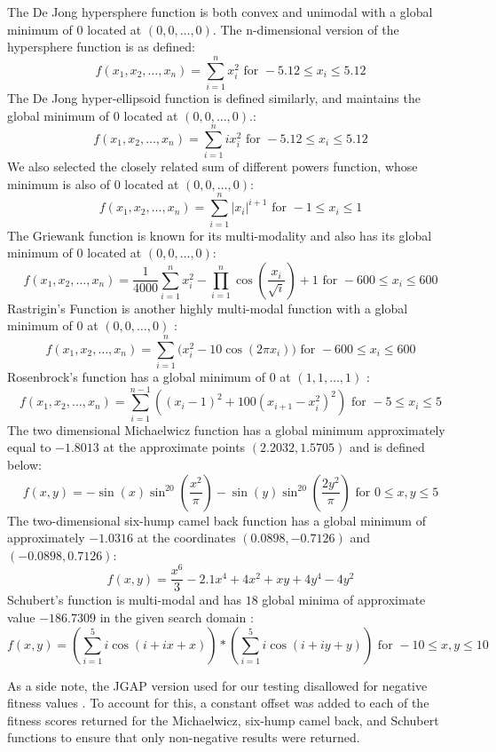 %
%
The De Jong hypersphere function is both convex and unimodal with a global minimum of $0$ located at $(0,0,\ldots,0)$. The n-dimensional version of the hypersphere function is as defined:
\[ f(x_1,x_2,\ldots,x_n) = \sum\limits_{i=1}^n x_i^2 \text{ for } -5.12 \leq x_i \leq 5.12 \]
%
%
The De Jong hyper-ellipsoid function is defined similarly, and maintains the global minimum of $0$ located at $(0,0,\ldots,0)$.:
\[ f(x_1,x_2,\ldots,x_n) = \sum\limits_{i=1}^n ix_i^2 \text{ for } -5.12 \leq x_i \leq 5.12\]
%
%
We also selected the closely related sum of different powers function, whose minimum is also of $0$ located at $(0,0,\ldots,0)$:
\[ f(x_1,x_2,\ldots,x_n) = \sum\limits_{i=1}^n |x_i|^{i+1} \text{ for } -1 \leq x_i \leq 1\]
%
%
The Griewank function is known for its multi-modality and also has its global minimum of $0$ located at $(0,0,\ldots,0)$:
 \[ f(x_1,x_2,\ldots,x_n) = \frac{1}{4000}\sum\limits_{i=1}^n x_i^{2} - \prod\limits_{i=1}^{n} \cos \left(\frac{x_i}{\sqrt{i}} \right)+1 \text{ for } -600 \leq x_i \leq 600\]
 Rastrigin's Function is another highly multi-modal function with a global minimum of $0$ at $(0,0,\ldots,0)$ :
 \[f(x_1,x_2,\ldots,x_n) = \sum\limits_{i=1}^n \big( x_i^2 - 10\cos(2\pi x_i) \big)\text{ for } -600 \leq x_i \leq 600\]
 Rosenbrock's function has a global minimum of 0 at $(1,1,\ldots,1)$ :
 \[f(x_1,x_2,\ldots,x_n) = \sum\limits_{i=1}^{n-1} ((x_i-1)^2 + 100(x_{i+1}-x_i^2)^2) \text{ for } -5 \leq x_i \leq 5\]
 The two dimensional Michaelwicz function has a global minimum approximately equal to $-1.8013$ at the approximate points $(2.2032,1.5705)$ and is defined below:
 \[ f(x,y) = -\sin(x)\sin^{20} \left(\frac{x^2}{\pi} \right) - \sin(y)\sin^{20} \left(\frac{2y^2}{\pi} \right) \text{ for } 0 \leq x,y \leq 5\]
 The two-dimensional six-hump camel back function has a global minimum of approximately $-1.0316$ at the coordinates $(0.0898,-0.7126)$ and $(-0.0898,0.7126)$:
 \[f(x,y) = \frac{x^6}{3}-2.1x^4+4x^2+xy+4y^4-4y^2 \]
 Schubert's function is multi-modal and has $18$ global minima of approximate value $-186.7309$ in the given search domain :
 \[ f(x,y) = \left( \sum\limits_{i=1}^{5} i\cos(i + ix + x) \right) * \left( \sum\limits_{i=1}^{5} i\cos(i + iy + y) \right) \text{ for } -10 \leq x,y \leq 10 \]
 
As a side note, the JGAP version used for our testing disallowed for negative fitness values \cite{jgap}. To account for this, a constant offset was added to each of the fitness scores returned for the Michaelwicz, six-hump camel back, and Schubert functions to ensure that only non-negative results were returned.
 
